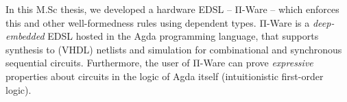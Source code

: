     In this M.Sc thesis, we developed a hardware \ac{EDSL} -- Π-Ware -- which enforces this and other
    well-formedness rules using dependent types.
    Π-Ware is a \emph{deep-embedded} \ac{EDSL} hosted in the Agda programming language,
    that supports synthesis to (\acs{VHDL}) netlists and simulation for combinational and synchronous sequential circuits.
    Furthermore, the user of Π-Ware can prove \emph{expressive} properties about circuits in the logic
    of Agda itself (intuitionistic first-order logic).


